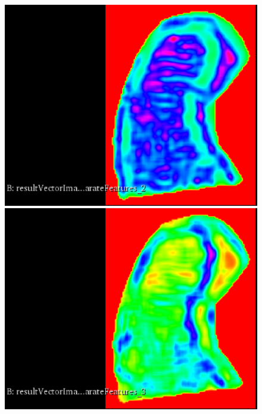 \documentclass{InsightArticle}
\begin{document}
\begin{figure}[H]
  \begin{center}
    \includegraphics[scale=0.3]{figures/GreyLevelNonuniformity.eps}
    \includegraphics[scale=0.3]{figures/RunLengthNonuniformity.eps}

\end{center}
\end{figure}
\end{document}
